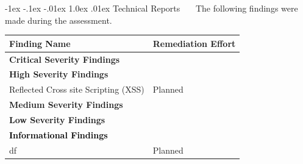 \documentclass{article}
\makeatletter
\renewcommand{\section}{\@startsection{section}{1}{\z@}%
            {-1ex \@plus -.1ex \@minus -.01ex}%
            {1.0ex \@plus  .01ex}%
            {\normalfont\large\bfseries\color{sectioncolor}}}
\makeatother
\begin{document}
            
            \newpage
            \section{\large Technical Reports}
            \ \ \ The following findings were made during the assessment.    
            \begin{center}
                \begin{longtable}{|p{30em}|p{10em}|}
            \hline
            \textbf{Finding Name} & \textbf{Remediation Effort}  \\
            \hline
            \multicolumn{2}{|p{20em}|}{\normalsize \textcolor{critical}{\textbf{Critical Severity Findings}}} \\
            \hline
            
        \multicolumn{2}{|p{20em}|}{\normalsize \textcolor{high}{\textbf{High Severity Findings}}} \\
        \hline
    
     Reflected Cross site Scripting (XSS)  &  Planned \\
    \hline
        \multicolumn{2}{|p{20em}|}{\normalsize \textcolor{medium}{\textbf{Medium Severity Findings}}} \\
        \hline
    
        \multicolumn{2}{|p{20em}|}{\normalsize \textcolor{low}{\textbf{Low Severity Findings}}} \\
        \hline
    
        \multicolumn{2}{|p{20em}|}{\normalsize \textcolor{infotext}{\textbf{Informational Findings}}} \\
        \hline
    
     df &  Planned \\
    \hline\end{longtable}
            \end{center}
            
                    \newpage
\end{document}
